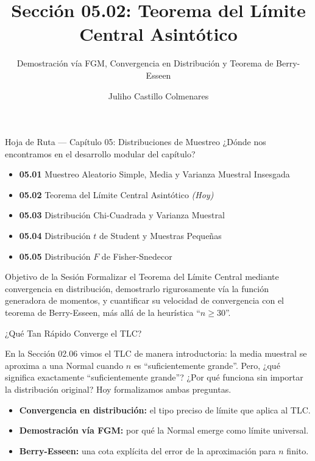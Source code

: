 \documentclass[10pt, aspectratio=169]{beamer}
\title[TLC Asintótico]{Sección 05.02: Teorema del Límite Central Asintótico}
\subtitle{Demostración vía FGM, Convergencia en Distribución y Teorema de Berry-Esseen}
\author[J. Castillo Colmenares]{Juliho Castillo Colmenares}
\institute{Tecnológico de Monterrey}
\date{\vspace{-1.2cm}}
\begin{document}
\begin{frame}[plain]
  \vspace{-0.8cm}
  \titlepage
\end{frame}

\begin{frame}{Hoja de Ruta --- Capítulo 05: Distribuciones de Muestreo}
  \footnotesize
  ¿Dónde nos encontramos en el desarrollo modular del capítulo? \pause
  \begin{itemize}\itemsep=0.08em
    \item \textbf{05.01} Muestreo Aleatorio Simple, Media y Varianza Muestral Insesgada \pause
    \item \textbf{05.02} Teorema del Límite Central Asintótico \emph{(Hoy)} \pause
    \item \textbf{05.03} Distribución Chi-Cuadrada y Varianza Muestral \pause
    \item \textbf{05.04} Distribución $t$ de Student y Muestras Pequeñas \pause
    \item \textbf{05.05} Distribución $F$ de Fisher-Snedecor
  \end{itemize}
  \vspace{-0.05cm}
  \begin{block}{Objetivo de la Sesión}
    Formalizar el Teorema del Límite Central mediante convergencia en distribución, demostrarlo rigurosamente vía la función generadora de momentos, y cuantificar su velocidad de convergencia con el teorema de Berry-Esseen, más allá de la heurística ``$n\ge30$''.
  \end{block}
\end{frame}

\begin{frame}{¿Qué Tan Rápido Converge el TLC?}
  \footnotesize
  \begin{motivacion}
    En la Sección 02.06 vimos el TLC de manera introductoria: la media muestral se aproxima a una Normal cuando $n$ es ``suficientemente grande''. Pero, ¿qué significa exactamente ``suficientemente grande''? ¿Por qué funciona sin importar la distribución original? Hoy formalizamos ambas preguntas.
  \end{motivacion}

  \vspace{0.15cm}
  \pause
  \begin{itemize}\itemsep=0.1cm
    \item \textbf{Convergencia en distribución:} el tipo preciso de límite que aplica al TLC. \pause
    \item \textbf{Demostración vía FGM:} por qué la Normal emerge como límite universal. \pause
    \item \textbf{Berry-Esseen:} una cota explícita del error de la aproximación para $n$ finito.
  \end{itemize}
\end{frame}
\end{document}
